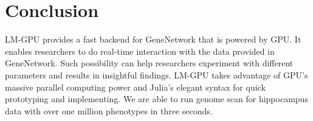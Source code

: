 \documentclass[9pt,twocolumn,twoside,lineno]{gsag3jnl}
\begin{document}
\section{Conclusion}

LM-GPU provides a fast backend for GeneNetwork that is powered by GPU. 
It enables researchers to do real-time interaction with the data provided in GeneNetwork. 
Such possibility can help researchers experiment with different parameters and results in insightful findings. 
LM-GPU takes advantage of GPU's massive parallel computing power and Julia's elegant syntax for quick prototyping and implementing. 
We are able to run genome scan for hippocampus data with over one million phenotypes in three seconds. 




\end{document}
